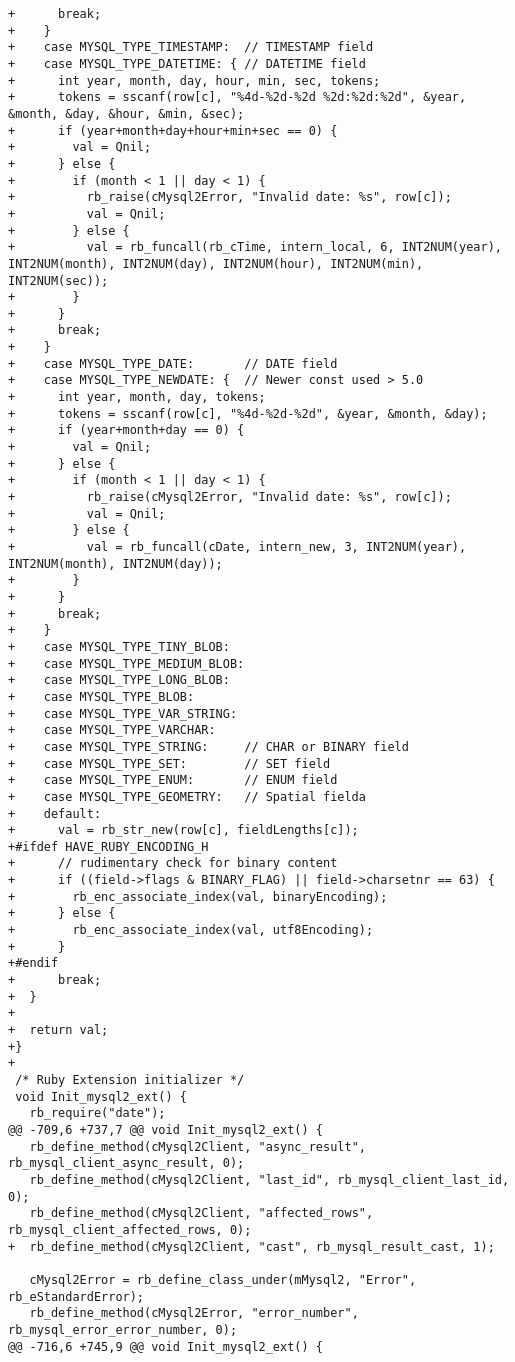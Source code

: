 \begin{lstlisting}
+      break;
+    }
+    case MYSQL_TYPE_TIMESTAMP:  // TIMESTAMP field
+    case MYSQL_TYPE_DATETIME: { // DATETIME field
+      int year, month, day, hour, min, sec, tokens;
+      tokens = sscanf(row[c], "%4d-%2d-%2d %2d:%2d:%2d", &year, &month, &day, &hour, &min, &sec);
+      if (year+month+day+hour+min+sec == 0) {
+        val = Qnil;
+      } else {
+        if (month < 1 || day < 1) {
+          rb_raise(cMysql2Error, "Invalid date: %s", row[c]);
+          val = Qnil;
+        } else {
+          val = rb_funcall(rb_cTime, intern_local, 6, INT2NUM(year), INT2NUM(month), INT2NUM(day), INT2NUM(hour), INT2NUM(min), INT2NUM(sec));
+        }
+      }
+      break;
+    }
+    case MYSQL_TYPE_DATE:       // DATE field
+    case MYSQL_TYPE_NEWDATE: {  // Newer const used > 5.0
+      int year, month, day, tokens;
+      tokens = sscanf(row[c], "%4d-%2d-%2d", &year, &month, &day);
+      if (year+month+day == 0) {
+        val = Qnil;
+      } else {
+        if (month < 1 || day < 1) {
+          rb_raise(cMysql2Error, "Invalid date: %s", row[c]);
+          val = Qnil;
+        } else {
+          val = rb_funcall(cDate, intern_new, 3, INT2NUM(year), INT2NUM(month), INT2NUM(day));
+        }
+      }
+      break;
+    }
+    case MYSQL_TYPE_TINY_BLOB:
+    case MYSQL_TYPE_MEDIUM_BLOB:
+    case MYSQL_TYPE_LONG_BLOB:
+    case MYSQL_TYPE_BLOB:
+    case MYSQL_TYPE_VAR_STRING:
+    case MYSQL_TYPE_VARCHAR:
+    case MYSQL_TYPE_STRING:     // CHAR or BINARY field
+    case MYSQL_TYPE_SET:        // SET field
+    case MYSQL_TYPE_ENUM:       // ENUM field
+    case MYSQL_TYPE_GEOMETRY:   // Spatial fielda
+    default:
+      val = rb_str_new(row[c], fieldLengths[c]);
+#ifdef HAVE_RUBY_ENCODING_H
+      // rudimentary check for binary content
+      if ((field->flags & BINARY_FLAG) || field->charsetnr == 63) {
+        rb_enc_associate_index(val, binaryEncoding);
+      } else {
+        rb_enc_associate_index(val, utf8Encoding);
+      }
+#endif
+      break;
+  }
+  
+  return val;
+}
+
 /* Ruby Extension initializer */
 void Init_mysql2_ext() {
   rb_require("date");
@@ -709,6 +737,7 @@ void Init_mysql2_ext() {
   rb_define_method(cMysql2Client, "async_result", rb_mysql_client_async_result, 0);
   rb_define_method(cMysql2Client, "last_id", rb_mysql_client_last_id, 0);
   rb_define_method(cMysql2Client, "affected_rows", rb_mysql_client_affected_rows, 0);
+  rb_define_method(cMysql2Client, "cast", rb_mysql_result_cast, 1);
 
   cMysql2Error = rb_define_class_under(mMysql2, "Error", rb_eStandardError);
   rb_define_method(cMysql2Error, "error_number", rb_mysql_error_error_number, 0);
@@ -716,6 +745,9 @@ void Init_mysql2_ext() {
 

\end{lstlisting}
